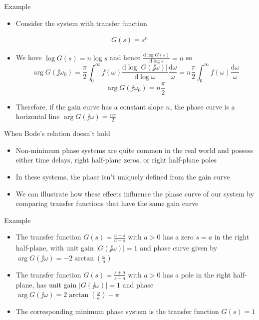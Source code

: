 \documentclass[10pt]{beamer-control}
\begin{document}
\begin{frame}{Example}
\begin{itemize}
	\item Consider the system with transfer function 
\end{itemize}
	\begin{gather}G(s)=s^n\end{gather}
\begin{itemize}
	\item We have $\log G(s) = n\log s$ and hence $\tfrac{\mathrm{d}\log G(s)}{\mathrm{d} \log s}=n$ so
	\begin{equation}
		\operatorname{arg}G(\jj\omega_0) = \frac{\pi}{2}\int^\infty_0 f(\omega) \frac{\mathrm{d}\log |G(\jj\omega)|}{\mathrm{d}\log \omega} \frac{\mathrm{d}\omega}{\omega}=n\frac{\pi}{2}\int^\infty_0 f(\omega)  \frac{\mathrm{d}\omega}{\omega}
	\end{equation}
	\begin{equation}
		\operatorname{arg}G(\jj\omega_0) = n\frac{\pi}{2}
	\end{equation}
	\item Therefore, if the gain curve has a constant slope $n$, the phase curve is a horizontal line $\operatorname{arg}G(\jj\omega)=\tfrac{n\pi}{2}$
\end{itemize}
\end{frame}


\begin{frame}{When Bode's relation doesn't hold}
\begin{itemize}
\item \alert{Non-minimum phase systems} are quite common in the real world and possess either time delays, right half-plane zeros, or right half-plane poles
\item In these systems, the phase isn't uniquely defined from the gain curve
\item We can illustrate how these effects influence the phase curve of our system by comparing transfer functions that have the same gain curve

\end{itemize}
\end{frame}

\begin{frame}{Example}
\begin{itemize}
	\item The transfer function $G(s)=\frac{a-s}{a+s}$ with $a>0$ has a zero $s=a$ in the right half-plane, with unit gain $|G(\jj\omega)|=1$ and phase curve given by $\operatorname{arg} G(\jj\omega) = -2\arctan (\tfrac{\omega}{a})$
	\item The transfer function $G(s)=\frac{s+a}{s-a}$ with $a>0$ has a pole in the right half-plane, has unit gain $|G(\jj\omega)|=1$ and phase  $\operatorname{arg} G(\jj\omega) = 2\arctan (\tfrac{\omega}{a}) - \pi$
	\item The corresponding minimum phase system is the transfer function $G(s)=1$
\end{itemize}
\end{frame}
\end{document}
